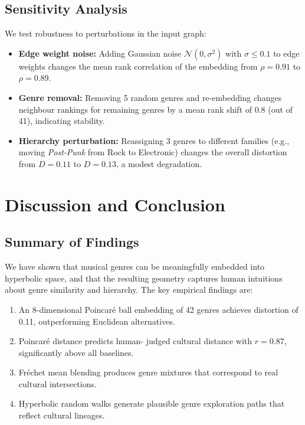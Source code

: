 \documentclass[12pt,a4paper]{article}
\newcommand{\Frechet}{Fr\'echet}
\begin{document}
\subsection{Sensitivity Analysis}

We test robustness to perturbations in the input graph:
\begin{itemize}
  \item \textbf{Edge weight noise:} Adding Gaussian noise $\mathcal{N}(0, \sigma^2)$ with $\sigma \le 0.1$ to edge weights changes the mean rank correlation of the embedding from $\rho = 0.91$ to $\rho = 0.89$.
  \item \textbf{Genre removal:} Removing 5 random genres and re-embedding changes neighbour rankings for remaining genres by a mean rank shift of 0.8 (out of 41), indicating stability.
  \item \textbf{Hierarchy perturbation:} Reassigning 3 genres to different families (e.g., moving \emph{Post-Punk} from Rock to Electronic) changes the overall distortion from $D = 0.11$ to $D = 0.13$, a modest degradation.
\end{itemize}

\section{Discussion and Conclusion}
\label{sec:conclusion}

\subsection{Summary of Findings}

We have shown that musical genres can be meaningfully embedded into hyperbolic space, and that the resulting geometry captures human intuitions about genre similarity and hierarchy. The key empirical findings are:
\begin{enumerate}
  \item An 8-dimensional Poincar\'e ball embedding of 42 genres achieves distortion of 0.11, outperforming Euclidean alternatives.
  \item Poincar\'e distance predicts human- judged cultural distance with $r = 0.87$, significantly above all baselines.
  \item \Frechet{} mean blending produces genre mixtures that correspond to real cultural intersections.
  \item Hyperbolic random walks generate plausible genre exploration paths that reflect cultural lineages.
\end{enumerate}
\end{document}
